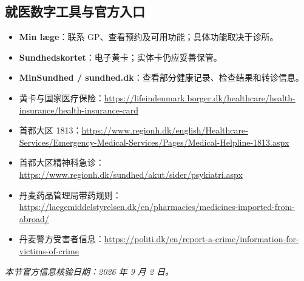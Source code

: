 \subsection{就医数字工具与官方入口}

\begin{itemize}[leftmargin=2em,itemsep=2pt]
  \item \textbf{Min læge}：联系 GP、查看预约及可用功能；具体功能取决于诊所。
  \item \textbf{Sundhedskortet}：电子黄卡；实体卡仍应妥善保管。
  \item \textbf{MinSundhed / sundhed.dk}：查看部分健康记录、检查结果和转诊信息。
  \item 黄卡与国家医疗保险：\url{https://lifeindenmark.borger.dk/healthcare/health-insurance/health-insurance-card}
  \item 首都大区 1813：\url{https://www.regionh.dk/english/Healthcare-Services/Emergency-Medical-Services/Pages/Medical-Helpline-1813.aspx}
  \item 首都大区精神科急诊：\url{https://www.regionh.dk/sundhed/akut/sider/psykiatri.aspx}
  \item 丹麦药品管理局带药规则：\url{https://laegemiddelstyrelsen.dk/en/pharmacies/medicines-imported-from-abroad/}
  \item 丹麦警方受害者信息：\url{https://politi.dk/en/report-a-crime/information-for-victims-of-crime}
\end{itemize}

\noindent\textit{本节官方信息核验日期：2026 年 9 月 2 日。}
